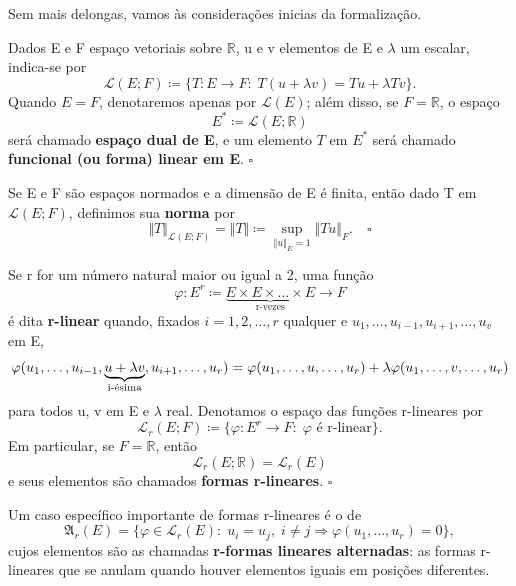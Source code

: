 \documentclass[../analysisII_notes.tex]{subfiles}
\begin{document}
Sem mais delongas, vamos às considerações inicias da formalização.
\begin{def*}
	Dados E e F espaço vetoriais sobre \(\mathbb{R}\), u e v elementos de E e \(\lambda \) um escalar, indica-se por
	\[
		\mathcal{L}(E; F)\coloneqq \{T:E\rightarrow F:\; T(u+\lambda v) = Tu + \lambda Tv\}.
	\]
	Quando \(E = F\), denotaremos apenas por \(\mathcal{L}(E)\); além disso, se \(F=\mathbb{R}\), o espaço
	\[
		E^{*}\coloneqq \mathcal{L}(E; \mathbb{R})
	\]
	será chamado \textbf{espaço dual de E}, e um elemento \(T\) em \(E^*\) será chamado \textbf{funcional (ou forma) linear em E}. \(\square\)
\end{def*}
\begin{def*}
	Se E e F são espaços normados e a dimensão de E é finita, então dado T em \(\mathcal{L}(E; F)\), definimos sua \textbf{norma} por
	\[
		\Vert T \Vert_{\mathcal{L}(E; F)} = \Vert T \Vert \coloneqq \sup_{\Vert u \Vert_{E}=1}\Vert Tu \Vert_{F}. \quad \square
	\]
\end{def*}
\begin{def*}
	Se r for um número natural maior ou igual a 2, uma função
	\[
		\varphi :E^{r}\coloneqq \underbrace{E \times E \times \dotsc \times E}_{\text{r-vezes}}\rightarrow F
	\]
	é dita \textbf{r-linear} quando, fixados \(i = 1, 2, \dotsc , r\) qualquer e \(u_{1}, \dotsc , u_{i-1}, u_{i+1}, \dotsc , u_{v}\) em E,
	\[
		\varphi (u_1, \dotsc , u_{i-1}, \underbrace{u + \lambda v}_{\mathclap{\text{i-ésima}}}, u_{i+1}, \dotsc , u_{r}) = \varphi (u_{1}, \dotsc , u, \dotsc , u_{r}) + \lambda \varphi (u_{1}, \dotsc , v, \dotsc ,u_{r})
	\]
	para todos u, v em E e \(\lambda \) real. Denotamos o espaço das funções r-lineares por
	\[
		\mathcal{L}_{r}(E; F)\coloneqq \{\varphi :E^{r}\rightarrow F:\; \varphi \text{ é r-linear}\}.
	\]
	Em particular, se \(F = \mathbb{R}\), então
	\[
		\mathcal{L}_{r}(E; \mathbb{R}) = \mathcal{L}_{r}(E)
	\]
	e seus elementos são chamados \textbf{formas r-lineares}. \(\square\)
\end{def*}
\begin{tcolorbox}[
		skin=enhanced,
		title=Observação,
		fonttitle=\bfseries,
		colframe=black,
		colbacktitle=cyan!75!white,
		colback=cyan!15,
		colbacklower=black,
		coltitle=black,
		drop fuzzy shadow,
	]
	Um caso específico importante de formas r-lineares é o de
	\[
		\mathfrak{A}_{r}(E) = \{\varphi \in \mathcal{L}_{r}(E):\;u_{i}= u_{j},\; i\neq j \Rightarrow \varphi(u_1, \dotsc , u_r) = 0\},
	\]
	cujos elementos são as chamadas \textbf{r-formas lineares alternadas}: as formas r-lineares que se anulam quando houver elementos iguais em posições diferentes.
\end{tcolorbox}
\end{document}
